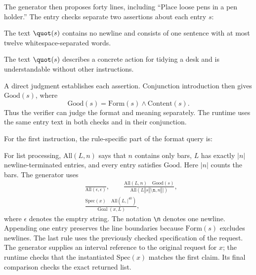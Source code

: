 \documentclass[11pt,twoside]{article}
\theoremstyle{definition}
\newcommand{\Goal}{\operatorname{Goal}}
\newcommand{\cat}{\mathbin{\Vert}}
\begin{document}
The generator then proposes forty lines,
including ``Place loose pens in a pen holder.'' The entry checks separate
two assertions about each entry $s$:
\begin{description}[leftmargin=1.3em,style=nextline]
\item[$\mathrm{Form}(s)$.] The text $\quot(s)$ contains no newline and consists
of one sentence with at most twelve whitespace-separated words.
\item[$\mathrm{Content}(s)$.] The text $\quot(s)$ describes a concrete action
for tidying a desk and is understandable without other instructions.
\end{description}
A direct judgment establishes each assertion. Conjunction introduction then
gives $\mathrm{Good}(s)$, where
\begin{equation}
\mathrm{Good}(s)=\mathrm{Form}(s)\wedge\mathrm{Content}(s).
\end{equation}
Thus the verifier can judge the format and meaning separately. The runtime
uses the same entry text in both checks and in their conjunction.

For the first instruction, the rule-specific part of the format query is:
\begin{quote}

\end{quote}

For list processing, $\mathrm{All}(L,n)$ says that $n$ contains only bars,
$L$ has exactly $|n|$ newline-terminated entries, and every entry satisfies
$\mathrm{Good}$. Here $|n|$ counts the bars. The generator uses
\begin{align}
&\frac{}{\mathrm{All}(\epsilon,\epsilon)},\qquad
 \frac{\mathrm{All}(L,n)\quad \mathrm{Good}(s)}
 {\mathrm{All}(L\cat s\cat\texttt{\textbackslash n},n\cat\texttt{|})},
 \label{eq:desk-rules}\\[4pt]
&\frac{\mathrm{Spec}(x)\quad\mathrm{All}(L,\texttt{|}^{40})}{\Goal(x,L)},
\end{align}
where $\epsilon$ denotes the emptry string.
The notation \texttt{\textbackslash n} denotes one newline. Appending one
entry preserves the line boundaries because $\mathrm{Form}(s)$ excludes
newlines. The last rule uses the previously checked specification of the
request. The generator supplies an interval reference to the original
request for $x$; the runtime checks that the instantiated $\mathrm{Spec}(x)$
matches the first claim. Its final comparison checks the exact returned list.
\end{document}
